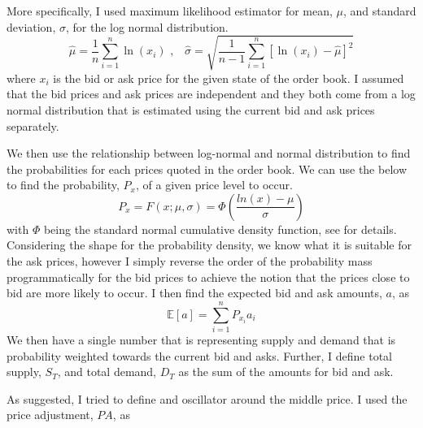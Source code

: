 \documentclass[12pt]{article}
\begin{document}
More specifically, I used maximum likelihood estimator for mean, $\mu$, and standard deviation, $\sigma$, for the log normal distribution.
\[
	\hat{\mu} = \frac{1}{n} \sum_{i=1}^{n} \ln{(x_i)} \text{  ,} \quad \hat{\sigma} = \sqrt{\frac{1}{n-1} \sum_{i=1}^{n} [\ln{(x_i)} - \hat{\mu}]^2 }
\]
where $x_i$ is the bid or ask price for the given state of the order book. I assumed that the bid prices and ask prices are independent and they both come from a log normal distribution that is estimated using the current bid and ask prices separately.

We then use the relationship between log-normal and normal distribution to find the probabilities for each prices quoted in the order book. We can use the below to find the probability,  $P_x$, of a given price level to occur.
\[
	P_x = F(x; \mu, \sigma) = \Phi \left( \frac{ln{(x)} - \mu}{\sigma} \right)
\]
with $\Phi$ being the standard normal cumulative density function, see \cite{bury} for details. Considering the shape for the probability density, we know what it is suitable for the ask prices, however I simply reverse the order of the probability mass programmatically for the bid prices to achieve the notion that the prices close to bid are more likely to occur. I then find the expected bid and ask amounts, $a$, as
\[
	\mathbb{E}[a] = \sum_{i=1}^{n} P_{x_i} a_i
\]
We then have a single number that is representing supply and demand that is probability weighted towards the current bid and asks. Further, I define total supply, $S_T$, and total demand, $D_T$ as the sum of the amounts for bid and ask.

As suggested, I tried to define and oscillator around the middle price. I used the price adjustment, $PA$, as
\end{document}
